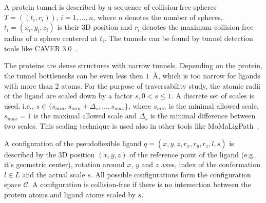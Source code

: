 \documentclass{svmult}
\def\C{\mathcal{C}}
\def\CFD{{\mathcal{C}^s_{free}}}
\def\smin{s_{min}}
\def\smax{s_{max}}
\def\sdelta{{\Delta}_s}
\def\L{L}
\begin{document}
A protein tunnel is described by a sequence of collision-free spheres $T=( (t_i, r_i) )$, $i=1,\ldots,n$, where $n$ denotes the number of spheres,
$t_i=(x_i,y_i,z_i)$ is their 3D position and $r_i$ denotes the maximum collision-free radius of a sphere centered at $t_i$. 
The tunnels can be found by tunnel detection tools like CAVER 3.0~\cite{caver3}.



The proteins are dense structures with narrow tunnels.
Depending on the protein, the tunnel bottlenecks can be even less then $1$~\AA, which is too narrow for ligands with more than 2 atoms.
For the purpose of traversability study, the atomic radii of the ligand are scaled down by a factor $s, 0 < s \le 1$.
A discrete set of scales is used, i.e., $s \in \{\smin, \smin+\sdelta, \ldots, \smax\}$, where 
$\smin$ is the minimal allowed scale, $\smax=1$ is the maximal allowed scale and $\sdelta$ is the minimal difference between two scales.
This scaling technique is used also in other tools like MoMaLigPath~\cite{cortes2005path}.

A configuration of the pseudoflexible ligand $q=(x,y,z,r_x,r_y,r_z,l,s)$  is described
by the 3D position $(x,y,z)$ of the reference point of the ligand (e.g., it's geometric center), rotation around $x$, $y$ and $z$ axes,
index of the conformation $l\in \L$ and the actual scale $s$.
All possible configurations form the configuration space $\C$. 
A configuration is collision-free if there is no intersection between the protein atoms and ligand atoms scaled by $s$.
\end{document}
